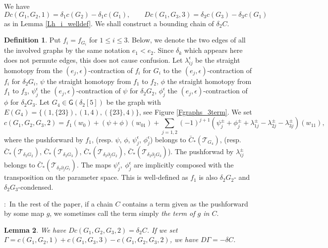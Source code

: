 \documentclass[reqno]{amsart}
\theoremstyle{definition}
\newtheorem{defi}{Definition}[section]
\theoremstyle{plain}
\newtheorem{lem}[defi]{Lemma}
\newcommand{\eps}{\epsilon}
\newcommand{\TT}{\mathcal{T}} %
\newcommand{\GG}{\mathsf{G}}%
\begin{document}
We have 
\[
Dc(G_1,G_2,1)=\delta_1c(G_2)-\delta_1c(G_1), \qquad Dc(G_1,G_3,3)=\delta_3c(G_3)-\delta_3c(G_1)
\]
as in Lemma \ref{Lh_i_welldef}.
We shall construct a bounding chain of  
$\delta_2C$. 
\begin{defi}\label{Dbound_3term}
Put $f_i=f_{G_i}$ for $1\leq i\leq 3$. Below, we denote the two edges of all the involved graphs  by the same notation $e_1<e_2$. Since $\delta_k$ which appears here does not permute edges, this does not cause confusion.  Let $\lambda_{ij}^\eps$ be the straight homotopy from the $(e_j,\eps)$-contraction of $f_i$ for $G_i$ to the $(e_j,\eps)$-contraction of $f_i$ for $\delta_2G_i$, 
$\psi$ the straight homotopy  from $f_1$ to  $f_2$, 
$\phi$ the straight homotopy  from  $f_1$ to  $f_3$, $\psi_j^{\eps}$ the $(e_j,\eps)$-contraction of $\psi$ for $\delta_2G_2$, $\phi_j^\eps$ the $(e_j,\eps)$-contraction of $\phi$ for $\delta_2G_3$. Let $G_4\in\GG(\delta_2[5])$ be the graph with $E(G_4)=\{(1,\{23\}),(1,4),(\{23\},4)\}$, see Figure \ref{Fgraphs_3term}. We set
\[
c(G_1,G_2,G_3,2)=f_1(w_0)+(\psi+\phi)(w_{01})+\sum_{j=1,2}(-1)^{j+1}(\psi^\pm_j+\phi^\pm_j+\lambda^\pm_{1j}-\lambda^\pm_{2j}-\lambda^\pm_{3j})(w_{11}),
\]
where the pushforward by $f_1$, (resp. $\psi$, $\phi$, $\psi^\eps_j$, $\phi^\eps_j$) belongs to $\bar C_*(\TT_{G_4})$, (resp. $\bar C_*(\TT_{\delta_2G_2})$, $\bar C_*(\TT_{\delta_2G_3})$, $\bar C_*(\TT_{\delta_2\partial_jG_2})$, $\bar C_*(\TT_{\delta_2\partial_jG_3})$). The pushforwad by $\lambda_{ij}^\pm$ belongs to $\bar C_*(\TT_{\delta_2\partial_jG_i})$. The maps $\psi^\eps_j,\ \phi^\eps_j$ are implicitly composed with the  transposition on the parameter space. This is well-defined as $f_1$ is also $\delta_2G_2$- and $\delta_2G_3$-condensed. 
\end{defi}
:\ In the rest of the paper, if a chain  $C$ contains a  term given as the pushforward by some map $g$, we sometimes call the term simply {\em the term of $g$ in $C$}.
\begin{lem}\label{L3term}
We have
$Dc(G_1,G_2,G_3,2)=\delta_2C$. 
If we set $\Gamma=c(G_1,G_2,1)+c(G_1,G_3,3)-c(G_1,G_2,G_3,2)$, we have $D\Gamma=-\delta C$.
\end{lem}
\end{document}
